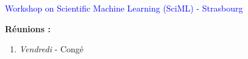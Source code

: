 \textcolor{blue}{Workshop on Scientific Machine Learning (SciML) - Strasbourg}

\textbf{Réunions :}
\begin{enumerate}[label=\textbullet]
	\item \textit{Vendredi} - Congé
\end{enumerate}